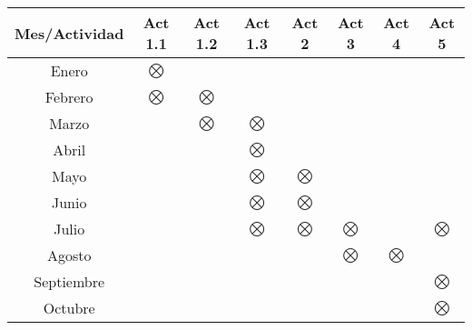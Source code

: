 \begin{center}
{\small
\begin{tabular}{|c|c|c|c|c|c|c|c|}
\hline

\textbf{Mes}/\textbf{Actividad}&\textbf{Act 1.1}&\textbf{Act 1.2}
&\textbf{Act 1.3}&\textbf{Act 2}&\textbf{Act 3}&\textbf{Act 4}&\textbf{Act 5}\\

\hline

Enero&$\bigotimes$&&&&&&\\

\hline

Febrero&$\bigotimes$&$\bigotimes$&&&&&\\

\hline

Marzo&&$\bigotimes$&$\bigotimes$&&&&\\

\hline

Abril&&&$\bigotimes$&&&&\\

\hline

Mayo&&&$\bigotimes$&$\bigotimes$&&&\\

\hline

Junio&&&$\bigotimes$&$\bigotimes$&&&\\

\hline
Julio&&&$\bigotimes$&$\bigotimes$&$\bigotimes$&&$\bigotimes$\\

\hline

Agosto&&&&&$\bigotimes$&$\bigotimes$&\\

\hline 

Septiembre&&&&&&&$\bigotimes$\\

\hline
Octubre&&&&&&&$\bigotimes$\\
\hline

\end{tabular}
}
\end{center}